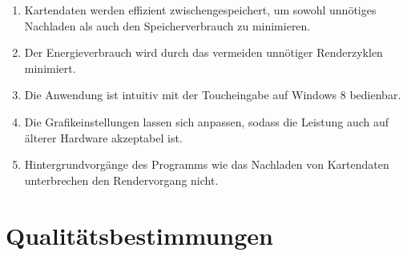 \documentclass[10pt]{scrreprt}
\begin{document}
\begin{enumerate}[leftmargin=2cm]
\item Kartendaten werden effizient zwischengespeichert, um sowohl unnötiges Nachladen als auch den Speicherverbrauch zu minimieren.
\item \W Der Energieverbrauch wird durch das vermeiden unnötiger Renderzyklen minimiert.
\item \W Die Anwendung ist intuitiv mit der Toucheingabe auf Windows 8 bedienbar.
\item \W Die Grafikeinstellungen lassen sich anpassen, sodass die Leistung auch auf älterer Hardware akzeptabel ist.
\item Hintergrundvorgänge des Programms wie das Nachladen von Kartendaten unterbrechen den Rendervorgang nicht.
\end{enumerate}



\chapter{Qualitätsbestimmungen}
\end{document}
